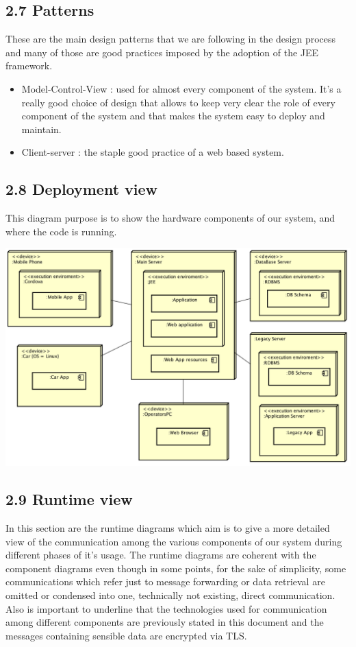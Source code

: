 \documentclass[]{article}
\providecommand{\tightlist}{%
  \setlength{\itemsep}{0pt}\setlength{\parskip}{0pt}}
\begin{document}
\subsection{2.7 Patterns}\label{patterns}

These are the main design patterns that we are following in the design
process and many of those are good practices imposed by the adoption of
the JEE framework.

\begin{itemize}
\tightlist
\item
  Model-Control-View : used for almost every component of the system.
  It's a really good choice of design that allows to keep very clear the
  role of every component of the system and that makes the system easy
  to deploy and maintain.
\item
  Client-server : the staple good practice of a web based system.
\end{itemize}

\subsection{2.8 Deployment view}\label{deployment-view}

This diagram purpose is to show the hardware components of our system,
and where the code is running.\newline

\centerline{\includegraphics{./deployment/diagram.png}}

\subsection{2.9 Runtime view}\label{runtime-view}

In this section are the runtime diagrams which aim is to give a more
detailed view of the communication among the various components of our
system during different phases of it's usage. The runtime diagrams are
coherent with the component diagrams even though in some points, for the
sake of simplicity, some communications which refer just to message
forwarding or data retrieval are omitted or condensed into one,
technically not existing, direct communication. Also is important to
underline that the technologies used for communication among different
components are previously stated in this document and the messages
containing sensible data are encrypted via TLS.
\end{document}

